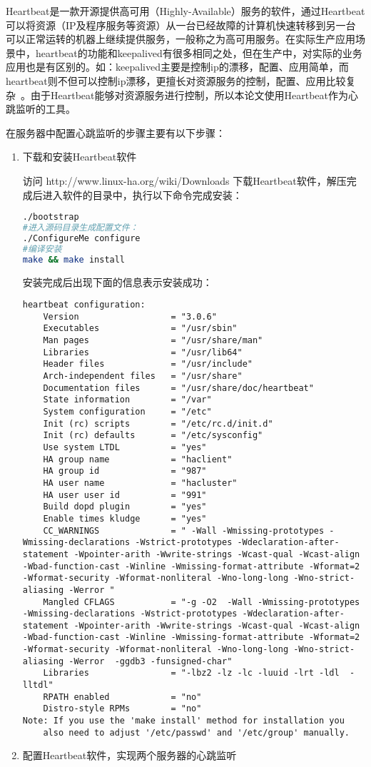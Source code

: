 Heartbeat是一款开源提供高可用（Highly-Available）服务的软件，通过Heartbeat可以将资源（IP及程序服务等资源）从一台已经故障的计算机快速转移到另一台可以正常运转的机器上继续提供服务，一般称之为高可用服务。在实际生产应用场景中，heartbeat的功能和keepalived有很多相同之处，但在生产中，对实际的业务应用也是有区别的。如：keepalived主要是控制ip的漂移，配置、应用简单，而heartbeat则不但可以控制ip漂移，更擅长对资源服务的控制，配置、应用比较复杂~\cite{郭绪晶2012服务器集群系统高可用模块设计与实现}。由于Heartbeat能够对资源服务进行控制，所以本论文使用Heartbeat作为心跳监听的工具。

在服务器中配置心跳监听的步骤主要有以下步骤：
\begin{enumerate}
\item 下载和安装Heartbeat软件

访问 http://www.linux-ha.org/wiki/Downloads 下载Heartbeat软件，解压完成后进入软件的目录中，执行以下命令完成安装：
\begin{lstlisting}[language=sh,numbers=none]
./bootstrap
#进入源码目录生成配置文件：
./ConfigureMe configure
#编译安装
make && make install
\end{lstlisting}
安装完成后出现下面的信息表示安装成功：
\begin{lstlisting}[numbers=none]
heartbeat configuration:
    Version                  = "3.0.6"
    Executables              = "/usr/sbin"
    Man pages                = "/usr/share/man"
    Libraries                = "/usr/lib64"
    Header files             = "/usr/include"
    Arch-independent files   = "/usr/share"
    Documentation files      = "/usr/share/doc/heartbeat"
    State information        = "/var"
    System configuration     = "/etc"
    Init (rc) scripts        = "/etc/rc.d/init.d"
    Init (rc) defaults       = "/etc/sysconfig"
    Use system LTDL          = "yes"
    HA group name            = "haclient"
    HA group id              = "987"
    HA user name             = "hacluster"
    HA user user id          = "991"
    Build dopd plugin        = "yes"
    Enable times kludge      = "yes"
    CC_WARNINGS              = " -Wall -Wmissing-prototypes -Wmissing-declarations -Wstrict-prototypes -Wdeclaration-after-statement -Wpointer-arith -Wwrite-strings -Wcast-qual -Wcast-align -Wbad-function-cast -Winline -Wmissing-format-attribute -Wformat=2 -Wformat-security -Wformat-nonliteral -Wno-long-long -Wno-strict-aliasing -Werror "
    Mangled CFLAGS           = "-g -O2  -Wall -Wmissing-prototypes -Wmissing-declarations -Wstrict-prototypes -Wdeclaration-after-statement -Wpointer-arith -Wwrite-strings -Wcast-qual -Wcast-align -Wbad-function-cast -Winline -Wmissing-format-attribute -Wformat=2 -Wformat-security -Wformat-nonliteral -Wno-long-long -Wno-strict-aliasing -Werror  -ggdb3 -funsigned-char"
    Libraries                = "-lbz2 -lz -lc -luuid -lrt -ldl  -lltdl"
    RPATH enabled            = "no"
    Distro-style RPMs        = "no"
Note: If you use the 'make install' method for installation you
    also need to adjust '/etc/passwd' and '/etc/group' manually.
\end{lstlisting}
\item 配置Heartbeat软件，实现两个服务器的心跳监听


\end{enumerate}
